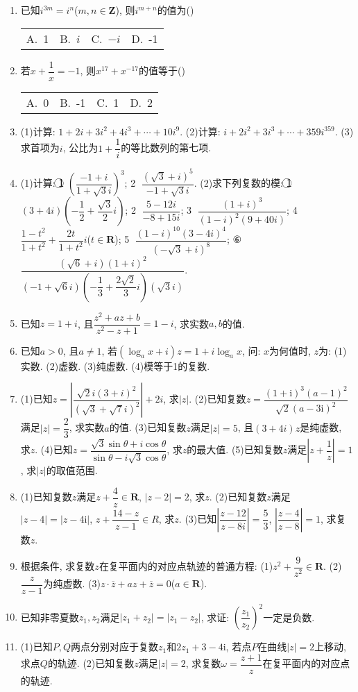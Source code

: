 \documentclass[10pt,a4paper]{article}
\newcommand{\fourch}[4]{\par\begin{tabular}{p{.23\textwidth}p{.23\textwidth}p{.23\textwidth}p{.23\textwidth}}
A.~#1 &B.~#2& C.~#3& D.~#4
\end{tabular}}
\begin{document}
\begin{enumerate}[1.]
\item 已知$i^{3m}=i^n$($m,n\in \mathbf{Z}$), 则$i^{m+n}$的值为()
\fourch{1}{$i$}{$-i$}{-1}
\item 若$x+\dfrac 1x=-1$, 则$x^{17}+x^{-17}$的值等于()
\fourch{0}{-1}{1}{2}
\item (1)计算: $1+2i+3i^2+4i^3+\cdots +10i^9$.
(2)计算:  $i+2i^2+3i^3+\cdots +359i^{359}$.
(3)求首项为$i$, 公比为$1+\dfrac 1i$的等比数列的第七项.
\item (1)计算:
\textcircled{1} $(\dfrac{-1+i}{1+\sqrt 3i})^3$; 							\textcircled{2} $\dfrac{{{(\sqrt 3+i)}^5}}{-1+\sqrt 3i}$.
(2)求下列复数的模:
\textcircled{1} $(3+4i)(-\dfrac 12+\dfrac{\sqrt 3}2i)$; 					\textcircled{2} $\dfrac{5-12i}{-8+15i}$;
\textcircled{3} $\dfrac{{{(1+i)}^3}}{{{(1-i)}^2}(9+40i)}$; 						\textcircled{4} $\dfrac{1-{t^2}}{1+{t^2}}+\dfrac{2t}{1+{t^2}}i$($t\in \mathbf{R}$);
\textcircled{5} $\dfrac{{{(1-i)}^{10}}{{(3-4i)}^4}}{{{(-\sqrt 3+i)}^8}}$; 						⑥$\dfrac{(\sqrt 6+i){{(1+i)}^2}}{(-1+\sqrt 6i)(-\dfrac 13+\dfrac{2\sqrt 2}3i)(\sqrt 3i)}$.
\item 已知$z=1+i$, 且$\dfrac{{z^2}+az+b}{{z^2}-z+1}=1-i$, 求实数$a,b$的值.
\item 已知$a>0$, 且$a\ne 1$, 若$(\log _ax+i)z=1+i\log _ax$, 问: $x$为何值时, $z$为:
(1)实数.		(2)虚数.			(3)纯虚数.			(4)模等于1的复数.
\item (1)已知$z=|\dfrac{\sqrt 2i{{(3+i)}^2}}{{{(\sqrt 3+\sqrt 7i)}^2}}|+2i$, 求$|z|$.
(2)已知复数$z=\dfrac{{{(1+\mathrm{i})}^3}{{(a-1)}^2}}{\sqrt 2{{(a-3\mathrm{i})}^2}}$满足$|z|=\dfrac 23$, 求实数$a$的值.
(3)已知复数$z$满足$|z|=5$, 且$(3+4i)z$是纯虚数, 求$z$.
(4)已知$z=\dfrac{\sqrt 3\sin \theta +i\cos \theta }{\sin \theta -i\sqrt 3\cos \theta }$, 求$z$的最大值.
(5)已知复数$z$满足$|z+\dfrac 1z|=1$, 求$|z|$的取值范围.
\item (1)已知复数$z$满足$z+\dfrac 4z\in \mathbf{R}$, $|z-2|=2$, 求$z$.
(2)已知复数$z$满足$|z-4|=|z-4\mathrm{i}|$, $z+\dfrac{14-z}{z-1}\in R$, 求$z$.
(3)已知$|\dfrac{z-12}{z-8i}|=\dfrac 53$, $|\dfrac{z-4}{z-8}|=1$, 求复数$z$.
\item 根据条件, 求复数$z$在复平面内的对应点轨迹的普通方程:
(1)$z^2+\dfrac 9{z^2}\in \mathbf{R}$.	(2)$\dfrac z{z-1}$为纯虚数.		(3)$z\cdot \overline z+az+\overline z=0$($a\in \mathbf{R}$).
\item 已知非零夏数$z_1,z_2$满足$|z_1+z_2|=|z_1-z_2|$, 求证: $(\dfrac{z_1}{z_2})^2$一定是负数.
\item (1)已知$P,Q$两点分别对应于复数$z_1$和$2z_1+3-4\mathrm{i}$, 若点$P$在曲线$|z|=2$上移动, 求点$Q$的轨迹.
(2)已知复数$z$满足$|z|=2$, 求复数$\omega =\dfrac{z+1}z$在复平面内的对应点的轨迹.

\end{enumerate}
\end{document}
